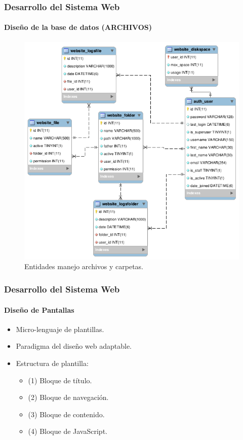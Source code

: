 \documentclass[spanish,xcolor=dvipsnames]{beamer}
\begin{document}
    \begin{frame}
    	\frametitle{Desarrollo del Sistema Web}
    	\framesubtitle{Diseño de la base de datos (ARCHIVOS)}
    	
    	\begin{figure}[H]
    		\centering
    		\includegraphics[scale=0.3]{img/archivosDB.png}
    		\caption{Entidades manejo archivos y carpetas.}
    		\label{entidadRelacionArchivosCarpetas}
    	\end{figure}
    	
    \end{frame}
    \begin{frame}
    	\frametitle{Desarrollo del Sistema Web}
    	\framesubtitle{Diseño de Pantallas}
    	
    	\begin{itemize}
    		\item Micro-lenguaje de plantillas.
    		\item Paradigma del diseño web adaptable.
    		\item Estructura de plantilla:
    		\begin{itemize}
    			\item (1) Bloque de título.
    			\item (2) Bloque de navegación.
    			\item (3) Bloque de contenido.
    			\item (4) Bloque de JavaScript.
    		\end{itemize}
    	\end{itemize}
    	
    \end{frame}
\end{document}
